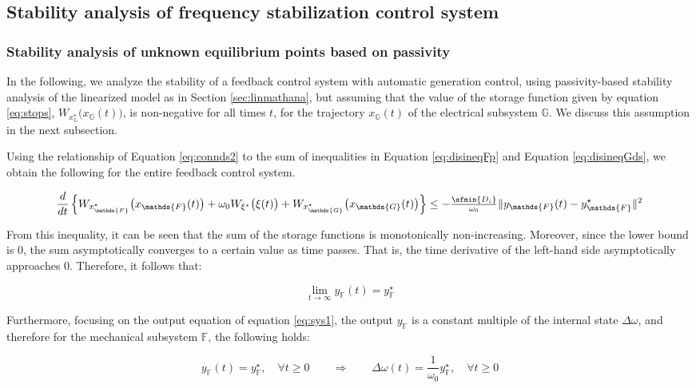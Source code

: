 \documentclass[graybox, envcountchap]{svmult}
\begin{document}
\subsection{Stability analysis of frequency stabilization control system\advanced}\label{sec:potconv}

\smallskip
\subsubsection{Stability analysis of unknown equilibrium points based on passivity}

In the following, we analyze the stability of a feedback control system with
automatic generation control, using passivity-based stability analysis of the
linearized model as in Section \ref{sec:linmathana}, but assuming that the value
of the storage function given by equation \ref{eq:stops},
$W_{x^{\star}_{\mathds{G}}}\bigl(x_{\mathds{G}}(t) \bigr)$, is non-negative for
all times $t$, for the trajectory $x_{\mathds{G}}(t)$ of the electrical
subsystem $\mathds{G}$. We discuss this assumption in the next subsection.

Using the relationship of Equation \ref{eq:connds2} to the sum of inequalities
in Equation \ref{eq:disineqFp} and Equation \ref{eq:disineqGds}, we obtain the
following for the entire feedback control system.

\[
  \frac{d}{dt}  \left\{
  W_{x^{\star}_{\mathds{F}}}  \bigl( x_{\mathds{F}}(t) \bigr) 
  +
  \omega_0
  W_{\xi^{\star}} \bigl( \xi(t) \bigr) 
  +
  W_{x^{\star}_{\mathds{G}}} \bigl(x_{\mathds{G}}(t) \bigr)
  \right\} 
  \leq 
  - \tfrac{\sfmin \left\{ D_i \right\}}{\omega_0}
  \|y_{\mathds{F}}(t) -y^{\star}_{\mathds{F}}\|^2
\]

From this inequality, it can be seen that the sum of the storage functions is
monotonically non-increasing. Moreover, since the lower bound is 0, the sum
asymptotically converges to a certain value as time passes. That is, the time
derivative of the left-hand side asymptotically approaches 0. Therefore, it
follows that:

\[
  \lim_{t\rightarrow \infty}
  y_{\mathds{F}}(t) = y^{\star}_{\mathds{F}}
\]

Furthermore, focusing on the output equation of equation \ref{eq:sys1}, the
output $y_{\mathds{F}}$ is a constant multiple of the internal state $\Delta
\omega$, and therefore for the mechanical subsystem $\mathds{F}$, the following
holds: 

\begin{equation}\label{eq:Fobsnl}
y_{\mathds{F}}(t)  =y^{\star}_{\mathds{F}},\quad \forall t\geq 0 
\qquad \Longrightarrow \qquad
\Delta \omega(t)  =\frac{1}{\omega_0} y^{\star}_{\mathds{F}},\quad \forall t\geq 0 
\end{equation}
\end{document}
